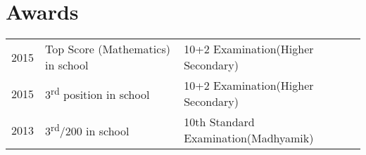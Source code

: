 \documentclass[]{deedy-resume-openfont}
\begin{document}
\begin{minipage}[t]{0.66\textwidth}
\section{Awards} 
\begin{tabular}{rll}
2015	     & Top Score (Mathematics) in school &10+2 Examination(Higher Secondary)\\
2015	     & 3\textsuperscript{rd} position in school  &10+2 Examination(Higher Secondary)\\
2013	     & 3\textsuperscript{rd}/200 in school  &10th Standard Examination(Madhyamik)\\
\end{tabular}
\sectionsep

\end{minipage} 
\end{document}
